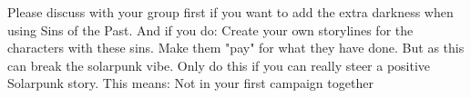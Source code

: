 Please discuss with your group first if you want to add the extra darkness when using Sins of the Past. And if you do: Create your own storylines for the characters with these sins. Make them "pay" for what they have done. But as this can break the solarpunk vibe. Only do this if you can really steer a positive Solarpunk story. This means: Not in your first campaign together